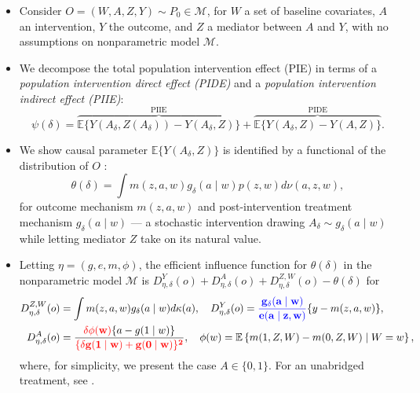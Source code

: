 \documentclass[landscape,a0paper,fontscale=0.285]{baposter} %
\begin{document}
\begin{poster}
{\begin{itemize}
\itemsep0.25pt
\item Consider $O = (W, A, Z, Y) \sim P_0 \in \mathcal{M}$, for $W$ a set of
  baseline covariates, $A$ an intervention, $Y$ the outcome, and $Z$ a mediator
  between $A$ and $Y$, with no assumptions on nonparametric model $\mathcal{M}$.
\item We decompose the total population intervention effect (PIE) in terms of a
  \textit{population intervention direct effect (PIDE)} and a \textit{population
  intervention indirect effect (PIIE)}:
  \begin{equation*}
    \psi(\delta) = \overbrace{\mathbb{E}\{Y(A_\delta, Z(A_\delta)) -
       Y(A_\delta, Z)\}}^{\text{PIIE}} + \overbrace{\mathbb{E}\{Y(A_\delta, Z)
       - Y(A, Z)\}}^{\text{PIDE}}.
  \end{equation*}
\item We show causal parameter $\mathbb{E}\{Y(A_\delta, Z)\}$ is identified by a
  functional of the distribution of $O$ \cite{diaz2019causal}:
  \begin{equation*}
    \theta(\delta) = \int m(z, a, w)g_{\delta}(a\mid w)p(z,w) d\nu(a,z,w),
  \end{equation*}
  for outcome mechanism $m(z,a,w)$ and post-intervention treatment mechanism
  $g_{\delta}(a\mid w)$ --- a stochastic intervention drawing
  $A_{\delta} \sim g_{\delta}(a \mid w)$ while letting mediator $Z$ take on its
  natural value.
\item Letting $\eta = (g, e, m, \phi)$, the efficient influence function for
  $\theta(\delta)$ in the nonparametric model $\mathcal{M}$ is
  $D^Y_{\eta, \delta}(o) + D^A_{\eta, \delta}(o) + D^{Z, W}_{\eta, \delta}(o) -
  \theta(\delta)$ for
  \vspace{-0.5em}
  \begin{align*}
    D^{Z, W}_{\eta, \delta}(o) &= \int m(z, a, w) g_{\delta}(a \mid w)
      d\kappa(a),
    \quad
    D^Y_{\eta, \delta}(o) = \mathbf{\textcolor{blue}{\frac{g_{\delta}(a \mid w)}
      {e(a \mid z, w)}}} \{y - m(z,a,w) \},\\
    D^A_{\eta,\delta}(o) &= \frac{\mathbf{\textcolor{red}{\delta\phi(w)}}\{a -
      g(1 \mid w)\}}{\mathbf{\textcolor{red}{\{\delta g(1 \mid w) +
      g(0 \mid w)\}^2}}},
    \quad
    \phi(w) = \mathbb{E}\left\{m(1, Z, W) - m(0, Z, W) \mid W = w \right\},
  \end{align*}
  where, for simplicity, we present the case $A \in \{0, 1\}$. For an unabridged
  treatment, see \cite{diaz2019causal}.
\end{itemize}
\vspace{0.5cm} %
}

\end{poster}
\end{document}
